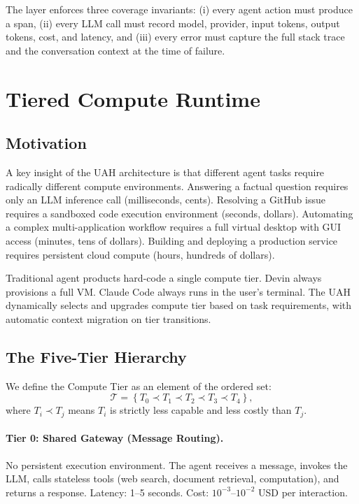 \documentclass[11pt]{article}
\begin{document}
The layer enforces three coverage invariants: (i) every agent action must
produce a span, (ii) every LLM call must record model, provider, input tokens,
output tokens, cost, and latency, and (iii) every error must capture the full
stack trace and the conversation context at the time of failure.

\section{Tiered Compute Runtime}
\label{sec:tiers}

\subsection{Motivation}

A key insight of the UAH architecture is that different agent tasks require
radically different compute environments. Answering a factual question requires
only an LLM inference call (milliseconds, cents). Resolving a GitHub issue
requires a sandboxed code execution environment (seconds, dollars). Automating
a complex multi-application workflow requires a full virtual desktop with GUI
access (minutes, tens of dollars). Building and deploying a production service
requires persistent cloud compute (hours, hundreds of dollars).

Traditional agent products hard-code a single compute tier. Devin always
provisions a full VM. Claude Code always runs in the user's terminal. The UAH
dynamically selects and upgrades compute tier based on task requirements,
with automatic context migration on tier transitions.

\subsection{The Five-Tier Hierarchy}

We define the Compute Tier as an element of the ordered set:
\begin{equation}
    \mathcal{T} = \left\{T_0 \prec T_1 \prec T_2 \prec T_3 \prec T_4\right\},
\end{equation}
where $T_i \prec T_j$ means $T_i$ is strictly less capable and less costly
than $T_j$.

\paragraph{Tier 0: Shared Gateway (Message Routing).}
No persistent execution environment. The agent receives a message, invokes
the LLM, calls stateless tools (web search, document retrieval, computation),
and returns a response. Latency: 1--5 seconds. Cost: $10^{-3}$--$10^{-2}$
USD per interaction.
\end{document}
